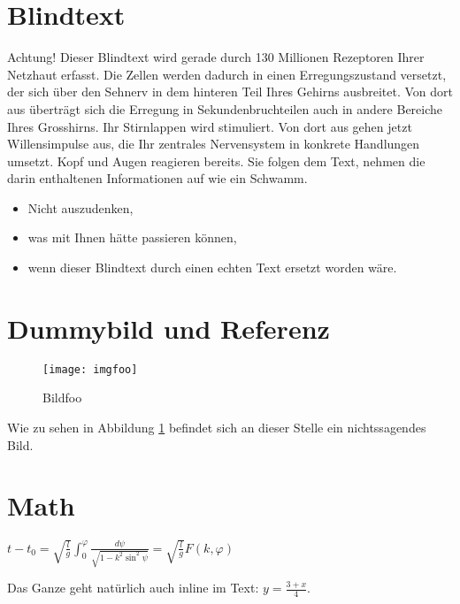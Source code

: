 \documentclass[a4paper,parskip=half,oneside]{scrbook}
\begin{document}
\section{Blindtext}
Achtung! Dieser Blindtext wird gerade durch 130 Millionen Rezeptoren Ihrer Netzhaut erfasst. Die Zellen werden dadurch in einen Erregungszustand versetzt, der sich über den Sehnerv in dem hinteren Teil Ihres Gehirns ausbreitet. Von dort aus überträgt sich die Erregung in Sekundenbruchteilen auch in andere Bereiche Ihres Grosshirns. Ihr Stirnlappen wird stimuliert. Von dort aus gehen jetzt Willensimpulse aus, die Ihr zentrales Nervensystem in konkrete Handlungen umsetzt. Kopf und Augen reagieren bereits. Sie folgen dem Text, nehmen die darin enthaltenen Informationen auf wie ein Schwamm.

\begin{itemize}
  \item Nicht auszudenken,
  \item was mit Ihnen hätte passieren können,
  \item wenn dieser Blindtext durch einen echten Text ersetzt worden wäre.
\end{itemize}

\section{Dummybild und Referenz}

  \begin{figure}[htbp]
    \centering
    \texttt{[image: imgfoo]}
    \caption{Bildfoo}
    \label{img:foo}
  \end{figure}

Wie zu sehen in Abbildung \ref{img:foo} befindet sich an dieser Stelle ein nichtssagendes Bild.

\section{Math}
\begin{math}
	t-t_{0}=\sqrt{\frac{l}{g}}\int_{0}^{\varphi}{\frac{d\psi}{\sqrt{1-k^{2}\sin^{2} {\psi}}}} = \sqrt{\frac{l}{g}} F(k,\varphi)
\end{math}

Das Ganze geht natürlich auch inline im Text: $y=\frac{3 + x}{4}$.
\end{document}
